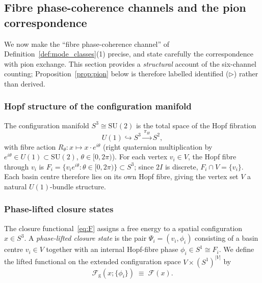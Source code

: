 \documentclass[12pt]{article}
\newcommand{\Fcal}{\mathcal{F}}
\begin{document}
\subsection{Fibre phase-coherence channels and the pion correspondence}\label{sec:fibre_hessian}

We now make the ``fibre phase-coherence channel'' of
Definition~\ref{def:mode_classes}(1) precise, and state carefully the
correspondence with pion exchange. This section provides a
\textit{structural} account of the six-channel counting;
Proposition~\ref{prop:pion} below is therefore labelled
identified ($\triangleright$) rather than derived.

\subsubsection*{Hopf structure of the configuration manifold}

The configuration manifold $S^3 \cong \mathrm{SU}(2)$ is the total space
of the Hopf fibration
\begin{equation}\label{eq:hopf}
    U(1) \hookrightarrow S^3 \xrightarrow{\,\pi_H\,} S^2,
\end{equation}
with fibre action $R_\theta : x \mapsto x \cdot e^{i\theta}$ (right
quaternion multiplication by $e^{i\theta} \in U(1) \subset \mathrm{SU}(2)$,
$\theta \in [0, 2\pi)$). For each vertex $v_i \in V$, the Hopf fibre
through $v_i$ is $F_i = \{v_i e^{i\theta} : \theta \in [0, 2\pi)\}
\subset S^3$; since $2I$ is discrete, $F_i \cap V = \{v_i\}$. Each
basin centre therefore lies on its own Hopf fibre, giving the vertex
set $V$ a natural $U(1)$-bundle structure.

\subsubsection*{Phase-lifted closure states}

The closure functional~\eqref{eq:F} assigns a free energy to a
spatial configuration $x \in S^3$. A \textit{phase-lifted closure
state} is the pair $\Psi_i = (v_i, \phi_i)$ consisting of a basin
centre $v_i \in V$ together with an internal Hopf-fibre phase
$\phi_i \in S^1 \cong F_i$. We define the lifted functional on the
extended configuration space $V \times (S^1)^{|V|}$ by
\begin{equation}\label{eq:F_gauged}
    \Fcal_{\mathrm{g}}(x; \{\phi_i\}) \;\equiv\; \Fcal(x).
\end{equation}
\end{document}
